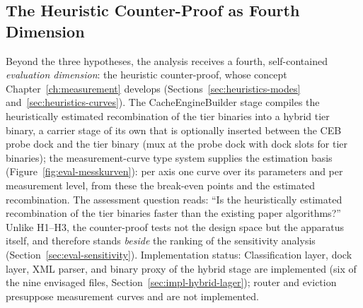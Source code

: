 \begin{nurkurz}
\subsection{The Heuristic Counter-Proof as Fourth Dimension}\label{sec:eval-counterproof}
Beyond the three hypotheses, the analysis receives a fourth, self-contained \emph{evaluation dimension}: the
heuristic counter-proof, whose concept Chapter~\ref{ch:measurement} develops
(Sections~\ref{sec:heuristics-modes} and~\ref{sec:heuristics-curves}). The CacheEngineBuilder stage compiles
the heuristically estimated recombination of the tier binaries into a hybrid tier binary, a carrier stage of
its own that is optionally inserted between the CEB probe dock and the tier binary (mux at the probe dock
with dock slots for tier binaries); the measurement-curve type system supplies the estimation basis
(Figure~\ref{fig:eval-messkurven}): per axis one curve over its parameters and per measurement level, from
these the break-even points and the estimated recombination. The assessment question reads: \enquote{Is the
heuristically estimated recombination of the tier binaries faster than the existing paper algorithms?}
Unlike H1--H3, the counter-proof tests not the design space but the apparatus itself, and therefore stands
\emph{beside} the ranking of the sensitivity analysis (Section~\ref{sec:eval-sensitivity}).
Implementation status: Classification layer, dock layer, XML parser, and binary proxy of the hybrid stage
are implemented (six of the nine envisaged files, Section~\ref{sec:impl-hybrid-lager}); router and eviction
presuppose measurement curves and are not implemented.
\begin{figure}[htbp]\centering
{}
\end{figure}
\end{nurkurz}
